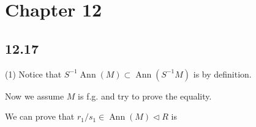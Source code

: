 \section{Chapter 12}

\subsection{12.17}

(1) Notice that $S^{-1}\operatorname{Ann}(M)\subset \operatorname{Ann}(S^{-1}M)$ is by definition. 

Now we assume $M$ is f.g. and try to prove the equality.

We can prove that $r_1/s_1\in \operatorname{Ann}(M)\triangleleft R$ is 